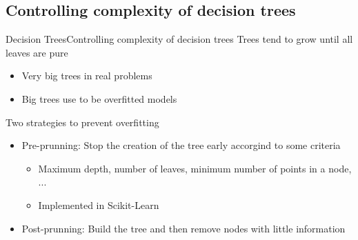 \documentclass[10pt,compress]{beamer} %
\begin{document}

\subsection{Controlling complexity of decision trees}

\begin{frame}{Decision Trees}{Controlling complexity of decision trees}
    Trees tend to grow until all leaves are pure
    \begin{itemize}
        \item Very big trees in real problems
        \item Big trees use to be overfitted models
    \end{itemize}

    Two strategies to prevent overfitting 
    \begin{itemize}
        \item Pre-prunning: Stop the creation of the tree early accorgind to some criteria
            \begin{itemize}
                \item Maximum depth, number of leaves, minimum number of points in a node, ...
                \item Implemented in Scikit-Learn
            \end{itemize}
        \item Post-prunning: Build the tree and then remove nodes with little information
    \end{itemize}

\end{frame}
\end{document}
